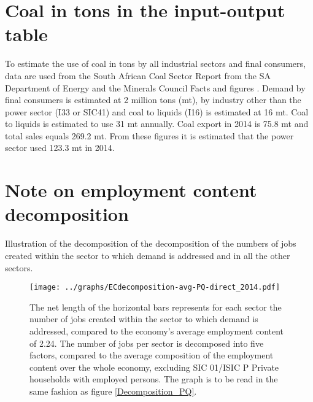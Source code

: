 \documentclass[12pt,english]{article}
\newcommand\lies[2][]{\todo[color=orange!50,#1]{ldf: #2}}
\begin{document}
\clearpage
\section{Coal in tons in the input-output table}

To estimate the use of coal in tons by all industrial sectors and final consumers, data are used from the South African Coal Sector Report from the SA Department of Energy \citep{coal2013DoE} and the Minerals Council Facts and figures . Demand by final consumers is estimated at 2 million tons (mt), by industry other than the power sector (I33 or SIC41) and coal to liquids (I16) is estimated at 16 mt. Coal to liquids is estimated to use 31 mt annually. Coal export in 2014 is 75.8 mt and total sales equals 269.2 mt. From these figures it is estimated that the power sector used 123.3 mt in 2014.

\section{Note on employment content decomposition}

Illustration of the decomposition of the decomposition of the numbers of jobs created within the sector to which demand is addressed and in all the other sectors.\lies{TODO}

\begin{figure}[!ht]
	\centering
	\texttt{[image: ../graphs/ECdecomposition-avg-PQ-direct\_2014.pdf]}
	\caption{\label{Decomposition_PQ_within}\footnotesize The net length of the horizontal bars represents for each sector the number of jobs created within the sector to which demand is addressed, compared to the economy's average employment content of 2.24. The number of jobs per sector is decomposed into five factors, compared to the average composition of the employment content over the whole economy, excluding SIC 01/ISIC P Private households with employed persons. The graph is to be read in the same fashion as figure \ref{Decomposition_PQ}. %
	}
\end{figure}	
\end{document}
